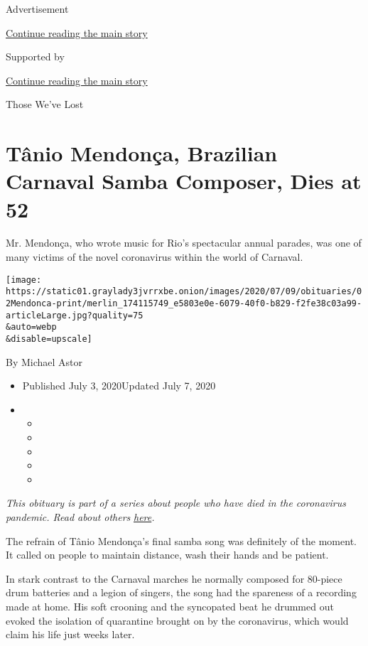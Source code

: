 Advertisement

\protect\hyperlink{after-top}{Continue reading the main story}

Supported by

\protect\hyperlink{after-sponsor}{Continue reading the main story}

Those We've Lost

\hypertarget{tuxe2nio-mendonuxe7a-brazilian-carnaval-samba-composer-dies-at-52}{%
\section{Tânio Mendonça, Brazilian Carnaval Samba Composer, Dies at
52}\label{tuxe2nio-mendonuxe7a-brazilian-carnaval-samba-composer-dies-at-52}}

Mr. Mendonça, who wrote music for Rio's spectacular annual parades, was
one of many victims of the novel coronavirus within the world of
Carnaval.

\texttt{[image: https://static01.graylady3jvrrxbe.onion/images/2020/07/09/obituaries/02Mendonca-print/merlin\_174115749\_e5803e0e-6079-40f0-b829-f2fe38c03a99-articleLarge.jpg?quality=75\\\&auto=webp\\\&disable=upscale]}

By Michael Astor

\begin{itemize}
\item
  Published July 3, 2020Updated July 7, 2020
\item
  \begin{itemize}
  \item
  \item
  \item
  \item
  \item
  \end{itemize}
\end{itemize}

\emph{This obituary is part of a series about people who have died in
the coronavirus pandemic. Read about others}
\href{https://www.nytimes3xbfgragh.onion/interactive/2020/obituaries/people-died-coronavirus-obituaries.html}{\emph{here}}\emph{.}

The refrain of Tânio Mendonça's final samba song was definitely of the
moment. It called on people to maintain distance, wash their hands and
be patient.

In stark contrast to the Carnaval marches he normally composed for
80-piece drum batteries and a legion of singers, the song had the
spareness of a recording made at home. His soft crooning and the
syncopated beat he drummed out evoked the isolation of quarantine
brought on by the coronavirus, which would claim his life just weeks
later.

